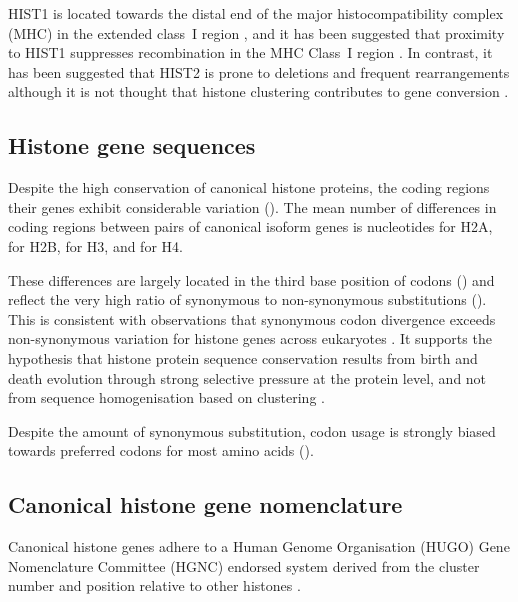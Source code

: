 	HIST1 is located towards the distal end of the major histocompatibility complex (MHC) 
	in the extended class~I region \citep{MHC-I-transcript, MHC-complete-sequencing-1999}, 
	and it has been suggested that proximity to HIST1 
	suppresses recombination in the MHC Class~I region \citep{MHC-repressed-by-HIST}. 
	In contrast, it has been suggested that HIST2 is prone to 
	deletions and frequent rearrangements \citep{HISTTwo-prone-deletion-discovery, HISTTwo-prone-deletion-focus}
	although it is not thought that histone clustering contributes to gene conversion \citep{NeiRooney2005}.

\subsection{Histone gene sequences}
	Despite the high conservation of canonical histone proteins, 
	the coding regions their genes exhibit considerable variation (). 
	The mean number of differences in coding regions between pairs of canonical isoform genes is 
	 nucleotides for H2A, 
	 for H2B, 
	 for H3, 
	and  for H4.

	These differences are largely located in the third base position of codons ()
	and reflect the very high ratio of synonymous to non-synonymous substitutions ().
	This is consistent with observations that 
	synonymous codon divergence exceeds non-synonymous variation 
	for histone genes across eukaryotes \citep{Piontkivska2002, Rooney2002}. 
	It supports the hypothesis that histone protein sequence conservation 
	results from birth and death evolution through strong selective pressure at the protein level, 
	and not from sequence homogenisation based on clustering \citep{NeiRooney2005}.

	Despite the amount of synonymous substitution, 
	codon usage is strongly biased towards preferred codons for most amino acids ().

\subsection{Canonical histone gene nomenclature}
	Canonical histone genes adhere to a Human Genome Organisation (HUGO) Gene Nomenclature Committee (HGNC) 
	endorsed system derived from the cluster number and position relative to other histones \citep{Marzluff02}.

